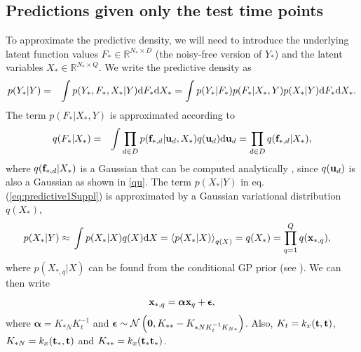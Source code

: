 \subsection{Predictions given only the test time points \label{supplUnobservedData}}
To approximate the predictive density, we will need to introduce the underlying latent function values $F_* \in \mathbb{R}^{N_* \times D}$ (the noisy-free version of $Y_*$) and the latent variables $X_* \in \mathbb{R}^{N_* \times Q}$. We  write the predictive density as
\begin{eqnarray}
p(Y_* | Y) & = & \int p(Y_*, F_*, X_*| Y)  \text{d}  F_* \text{d}  X_* =  \int p(Y_* | F_*)  p(F_*|X_*, Y) p(X_*|  Y) \text{d}  F_* \text{d}  X_* .
\label{eq:predictive1Suppl}
\end{eqnarray}
The term $p(F_* |X_*, Y)$ is approximated according to
\begin{eqnarray}
q(F_*|X_*) & = & \int \prod_{d \in D} p(\mathbf{f}_{*,d} | \mathbf{u}_d, X_*)  q(\mathbf{u}_d) \text{d}  \mathbf{u}_d 
	    = \prod_{d \in D} q(\mathbf{f}_{*,d} | X_*)  ,
\end{eqnarray}
where $q(\mathbf{f}_{*,d} | X_*)$ is a Gaussian that can be computed analytically , since $q(\mathbf{u}_d)$ is also a Gaussian as shown in \eqref{qu}.
The term $p(X_*| Y)$ in eq. (\ref{eq:predictive1Suppl}) is approximated by
a Gaussian variational distribution $q(X_*)$,
%
\begin{align}
p(X_* | Y) \approx {}& \int  p(X_* | X) q(X) \text{d}  X = \left\langle  p(X_* | X) \right\rangle_{q(X)} = q(X_*) = \prod_{q=1}^Q q(\mathbf{x}_{*,q}),\label{qxstarSuppl}
\end{align}
%
where $p( X_{*,q} | X)$ can be found from the conditional GP prior
(see \cite{rasmussen-williams}). We can then write
%
\begin{equation}
\label{qxstar2Suppl}
\mathbf{x}_{*,q} = \boldsymbol \alpha \mathbf{x}_q + \boldsymbol \epsilon,
\end{equation} 
%
where $\boldsymbol \alpha = K_{*N}K_t^{-1}$ and 
$\boldsymbol \epsilon \sim \mathcal{N} \left( \mathbf{0}, K_{**} - K_{*N K_t^{-1} K_{N*}}\right)$. Also, $K_t = k_x(\mathbf{t}, \mathbf{t})$, $K_{*N} = k_x(\mathbf{t}_*, \mathbf{t})$ and $K_{**} = k_x(\mathbf{t}_* \mathbf{t}_*)$. 
